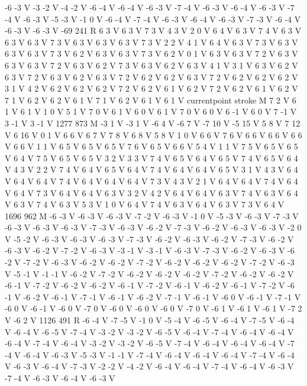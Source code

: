 {{-6 -3 V
-3 -2 V
-4 -2 V
-6 -4 V
-6 -4 V
-6 -3 V
-7 -4 V
-6 -3 V
-6 -4 V
-6 -3 V
-7 -4 V
-6 -3 V
-5 -3 V
-1 0 V
-6 -4 V
-7 -4 V
-6 -3 V
-6 -4 V
-6 -3 V
-7 -3 V
-6 -4 V
-6 -3 V
-6 -3 V
-69 241 R
6 3 V
6 3 V
7 3 V
4 3 V
2 0 V
6 4 V
6 3 V
7 4 V
6 3 V
6 3 V
6 3 V
7 3 V
6 3 V
6 3 V
6 3 V
7 3 V
2 2 V
4 1 V
6 4 V
6 3 V
7 3 V
6 3 V
6 3 V
6 3 V
7 3 V
6 2 V
6 3 V
6 3 V
7 3 V
6 2 V
0 1 V
6 3 V
6 3 V
7 2 V
6 3 V
6 3 V
6 3 V
7 2 V
6 3 V
6 2 V
7 3 V
6 3 V
6 2 V
6 3 V
4 1 V
3 1 V
6 3 V
6 2 V
6 3 V
7 2 V
6 3 V
6 2 V
6 3 V
7 2 V
6 2 V
6 2 V
6 3 V
7 2 V
6 2 V
6 2 V
6 2 V
3 1 V
4 2 V
6 2 V
6 2 V
6 2 V
7 2 V
6 2 V
6 1 V
6 2 V
7 2 V
6 2 V
6 1 V
6 2 V
7 1 V
6 2 V
6 2 V
6 1 V
7 1 V
6 2 V
6 1 V
6 1 V
currentpoint stroke M
7 2 V
6 1 V
6 1 V
1 0 V
5 1 V
7 0 V
6 1 V
6 0 V
6 1 V
7 0 V
6 0 V
6 -1 V
6 0 V
7 -1 V
3 -1 V
3 -1 V
1277 873 M
-3 1 V
-3 1 V
-6 4 V
-6 7 V
-7 10 V
-5 15 V
5 8 V
7 12 V
6 16 V
0 1 V
6 6 V
6 7 V
7 8 V
6 8 V
5 8 V
1 0 V
6 6 V
7 6 V
6 6 V
6 6 V
6 6 V
6 6 V
1 1 V
6 5 V
6 5 V
6 5 V
7 6 V
6 5 V
6 6 V
5 4 V
1 1 V
7 5 V
6 5 V
6 5 V
6 4 V
7 5 V
6 5 V
6 5 V
3 2 V
3 3 V
7 4 V
6 5 V
6 4 V
6 5 V
7 4 V
6 5 V
6 4 V
4 3 V
2 2 V
7 4 V
6 4 V
6 5 V
6 4 V
7 4 V
6 4 V
6 4 V
6 5 V
3 1 V
4 3 V
6 4 V
6 4 V
6 4 V
7 4 V
6 4 V
6 4 V
6 4 V
7 3 V
4 3 V
2 1 V
6 4 V
6 4 V
7 4 V
6 4 V
6 4 V
7 3 V
6 4 V
6 4 V
6 3 V
3 2 V
4 2 V
6 4 V
6 4 V
6 3 V
7 4 V
6 3 V
6 4 V
6 3 V
7 4 V
6 3 V
5 3 V
1 0 V
6 4 V
7 4 V
6 3 V
6 4 V
6 3 V
7 3 V
6 4 V
1696 962 M
-6 -3 V
-6 -3 V
-6 -3 V
-7 -2 V
-6 -3 V
-1 0 V
-5 -3 V
-6 -3 V
-7 -3 V
-6 -3 V
-6 -3 V
-6 -3 V
-7 -3 V
-6 -3 V
-6 -2 V
-7 -3 V
-6 -2 V
-6 -3 V
-6 -3 V
-2 0 V
-5 -2 V
-6 -3 V
-6 -3 V
-6 -3 V
-7 -3 V
-6 -2 V
-6 -3 V
-6 -2 V
-7 -3 V
-6 -2 V
-6 -3 V
-6 -2 V
-7 -2 V
-6 -3 V
-3 -1 V
-3 -1 V
-6 -3 V
-7 -3 V
-6 -2 V
-6 -3 V
-6 -2 V
-7 -2 V
-6 -3 V
-6 -2 V
-6 -2 V
-7 -2 V
-6 -2 V
-6 -2 V
-6 -2 V
-7 -2 V
-6 -3 V
-5 -1 V
-1 -1 V
-6 -2 V
-7 -2 V
-6 -2 V
-6 -2 V
-6 -2 V
-7 -2 V
-6 -2 V
-6 -2 V
-6 -1 V
-7 -2 V
-6 -2 V
-6 -2 V
-6 -1 V
-7 -2 V
-6 -1 V
-6 -2 V
-6 -1 V
-7 -2 V
-6 -1 V
-6 -2 V
-6 -1 V
-7 -1 V
-6 -1 V
-6 -2 V
-7 -1 V
-6 -1 V
-6 0 V
-6 -1 V
-7 -1 V
-6 0 V
-6 -1 V
-6 0 V
-7 0 V
-6 0 V
-6 0 V
-6 0 V
-7 0 V
-6 1 V
-6 1 V
-6 1 V
-7 2 V
-6 2 V
1126 491 R
-6 -4 V
-7 -5 V
-1 0 V
-5 -4 V
-6 -5 V
-6 -4 V
-7 -5 V
-6 -4 V
-6 -4 V
-6 -5 V
-7 -4 V
-3 -2 V
-3 -2 V
-6 -5 V
-6 -4 V
-7 -4 V
-6 -4 V
-6 -4 V
-6 -4 V
-7 -4 V
-6 -4 V
-3 -2 V
-3 -2 V
-6 -5 V
-7 -4 V
-6 -4 V
-6 -4 V
-6 -4 V
-7 -4 V
-6 -4 V
-6 -3 V
-5 -3 V
-1 -1 V
-7 -4 V
-6 -4 V
-6 -4 V
-6 -4 V
-7 -4 V
-6 -4 V
-6 -3 V
-6 -4 V
-7 -3 V
-2 -2 V
-4 -2 V
-6 -4 V
-6 -4 V
-7 -4 V
-6 -4 V
-6 -3 V
-7 -4 V
-6 -3 V
-6 -4 V
-6 -3 V
}}
